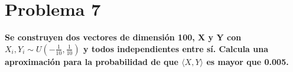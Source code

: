 \section*{Problema 7}

\textbf{
    Se construyen dos vectores de dimensión 100, X y Y con $X_i,Y_i \sim U\left(-\frac{1}{10},\frac{1}{10}\right )$ y todos independientes entre sí. Calcula una aproximación para la probabilidad de que $\langle X,Y \rangle$ es mayor que 0.005.
}